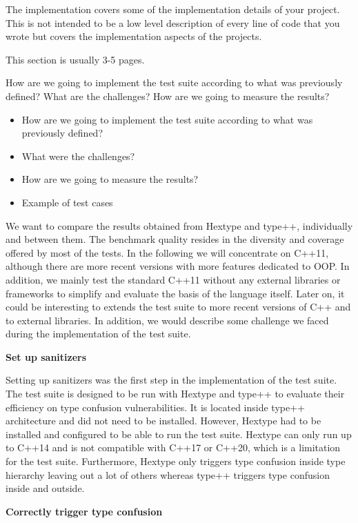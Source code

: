 \documentclass[a4paper,11pt,oneside]{report}
\begin{document}
The implementation covers some of the implementation details of your project.
This is not intended to be a low level description of every line of code that
you wrote but covers the implementation aspects of the projects.

This section is usually 3-5 pages.

How are we going to implement the test suite according to what was previously defined? What are the challenges? 
How are we going to measure the results?

\begin{itemize}
       \item How are we going to implement the test suite according to what was previously defined? 
       \item What were the challenges?
       \item How are we going to measure the results?
       \item Example of test cases
\end{itemize}

We want to compare the results obtained from Hextype and type++, individually
and between them. The benchmark quality resides in the diversity and coverage
offered by most of the tests. In the following we will concentrate on C++11,
although there are more recent versions with more features dedicated to OOP. In
addition, we mainly test the standard C++11 without any external libraries or
frameworks to simplify and evaluate the basis of the language itself. Later on,
it could be interesting to extends the test suite to more recent versions of C++
and to external libraries.  In addition, we would describe some challenge we
faced during the implementation of the test suite.

\textbf{Set up sanitizers}

\noindent{}Setting up sanitizers was the first step in the implementation of the
test suite.  The test suite is designed to be run with Hextype and type++ to
evaluate their efficiency on type confusion vulnerabilities.  It is located
inside type++ architecture and did not need to be installed. However, Hextype
had to be installed and configured to be able to run the test suite. Hextype can
only run up to C++14 and is not compatible with C++17 or C++20, which is a
limitation for the test suite. Furthermore, Hextype only triggers type confusion
inside type hierarchy leaving out a lot of others whereas type++ triggers type
confusion inside and outside. 

\textbf{Correctly trigger type confusion}
\end{document}
